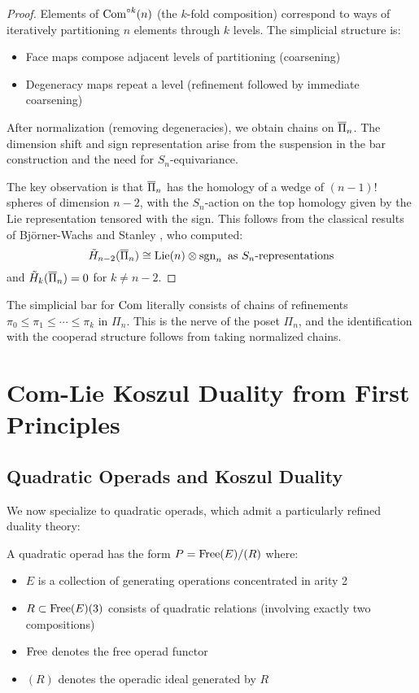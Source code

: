 \begin{proof}
Elements of $\operatorname{Com}^{\circ k}(n)$ (the $k$-fold composition) correspond to ways of iteratively partitioning $n$ elements through $k$ levels. The simplicial structure is:
\begin{itemize}
\item Face maps compose adjacent levels of partitioning (coarsening)
\item Degeneracy maps repeat a level (refinement followed by immediate coarsening)
\end{itemize}
 
After normalization (removing degeneracies), we obtain chains on $\overline{\Pi}_n$. The dimension shift and sign representation arise from the suspension in the bar construction and the need for $S_n$-equivariance.
 
The key observation is that $\overline{\Pi}_n$ has the homology of a wedge of $(n-1)!$ spheres of dimension $n-2$, with the $S_n$-action on the top homology given by the Lie representation tensored with the sign. This follows from the classical results of Björner-Wachs \cite{BW93} and Stanley \cite{Sta97}, who computed:
\[
\tilde{H}_{n-2}(\overline{\Pi}_n) \cong \operatorname{Lie}(n) \otimes \operatorname{sgn}_n \text{ as } S_n\text{-representations}
\]
and $\tilde{H}_k(\overline{\Pi}_n) = 0$ for $k \neq n-2$.
\end{proof}
\begin{remark}
The simplicial bar for $\operatorname{Com}$ literally consists of chains of refinements $\pi_0 \leq \pi_1 \leq \cdots \leq \pi_k$ in $\Pi_n$. This is the nerve of the poset $\Pi_n$, and the identification with the cooperad structure follows from taking normalized chains.
\end{remark}
 
\section{Com-Lie Koszul Duality from First Principles}
 
\subsection{Quadratic Operads and Koszul Duality}
 
We now specialize to quadratic operads, which admit a particularly refined duality theory:
 
\begin{definition}
A quadratic operad has the form $P = \operatorname{Free}(E)/(R)$ where:
\begin{itemize}
\item $E$ is a collection of generating operations concentrated in arity 2
\item $R \subset \operatorname{Free}(E)(3)$ consists of quadratic relations (involving exactly two compositions)
\item $\operatorname{Free}$ denotes the free operad functor
\item $(R)$ denotes the operadic ideal generated by $R$
\end{itemize}
\end{definition}
 
